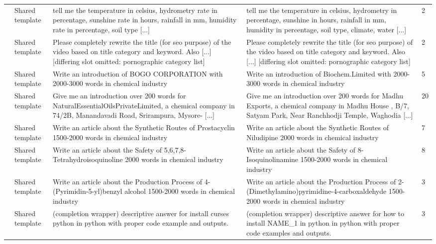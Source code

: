 {\begin{longtable}{@{}p{}p{}p{}p{}p{}@{}}
\addlinespace[3pt]
521 & Shared template & \raggedright tell me the temperature in celsius, hydrometry rate in percentage, sunshine rate in hours, rainfall in mm, humidity rate in percentage, soil type [...] & \raggedright tell me the temperature in celsius, hydrometry in percentage, sunshine in hours, rainfall in mm, humidity in percentage, soil type, climate, water [...] & 2\\
\addlinespace[3pt]
528 & Shared template & \raggedright Please completely rewrite the title (for seo purpose) of the video based on title category and keyword. Also [...] [differing slot omitted: pornographic category list] & \raggedright Please completely rewrite the title (for seo purpose) of the video based on title category and keyword. Also [...] [differing slot omitted: pornographic category list] & 2\\
\addlinespace[3pt]
545 & Shared template & \raggedright Write an introduction of BOGO CORPORATION with 2000-3000 words in chemical industry & \raggedright Write an introduction of Biochem.Limited with 2000-3000 words in chemical industry & 5\\
\addlinespace[3pt]
551 & Shared template & \raggedright Give me an introduction over 200 words for NaturalEssentialOilsPrivateLimited, a chemical company in 74/2B, Manandavadi Road, Srirampura, Mysore- [...] & \raggedright Give me an introduction over 200 words for Madhu Exports, a chemical company in Madhu House , B/7, Satyam Park, Near Ranchhodji Temple, Waghodia [...] & 20\\
\addlinespace[3pt]
578 & Shared template & \raggedright Write an article about the Synthetic Routes of Prostacyclin 1500-2000 words in chemical industry & \raggedright Write an article about the Synthetic Routes of Niludipine 2000 words in chemical industry & 7\\
\addlinespace[3pt]
591 & Shared template & \raggedright Write an article about the Safety of 5,6,7,8-Tetrahydroisoquinoline 2000 words in chemical industry & \raggedright Write an article about the Safety of 8-Isoquinolinamine 1500-2000 words in chemical industry & 8\\
\addlinespace[3pt]
600 & Shared template & \raggedright Write an article about the Production Process of 4-(Pyrimidin-5-yl)benzyl alcohol 1500-2000 words in chemical industry & \raggedright Write an article about the Production Process of 2-(Dimethylamino)pyrimidine-4-carboxaldehyde 1500-2000 words in chemical industry & 3\\
\addlinespace[3pt]
650 & Shared template & \raggedright (completion wrapper) descriptive answer for install curses python in python with proper code example and outputs. & \raggedright (completion wrapper) descriptive answer for how to install NAME\_1 in python in python with proper code examples and outputs. & 3\\

\end{longtable}}
